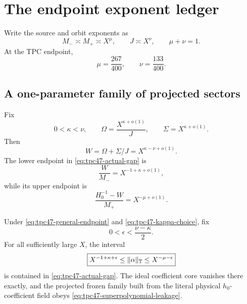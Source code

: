 \section{The endpoint exponent ledger}
\label{sec:tpc47-endpoint}

Write the source and orbit exponents as
\begin{equation}
 M_-\asymp M_+\asymp X^\mu,
 \qquad
 J\asymp X^\nu,
 \qquad
 \mu+\nu=1.
 \label{eq:tpc47-general-endpoint}
\end{equation}
At the TPC endpoint,
\begin{equation}
 \mu=\frac{267}{400},
 \qquad
 \nu=\frac{133}{400}.
 \label{eq:tpc47-mu-nu}
\end{equation}

\subsection{A one-parameter family of projected sectors}

Fix
\begin{equation}
 0<\kappa<\nu,
 \qquad
 \Omega=\frac{X^{\kappa+o(1)}}{J},
 \qquad
 \Sigma=X^{\kappa+o(1)}.
 \label{eq:tpc47-kappa-choice}
\end{equation}
Then
\begin{equation}
 W=\Omega+\Sigma/J=X^{\kappa-\nu+o(1)}.
 \label{eq:tpc47-W-scale}
\end{equation}
The lower endpoint in \eqref{eq:tpc47-actual-gap} is
\begin{equation}
 \frac{W}{M_-}=X^{-1+\kappa+o(1)},
 \label{eq:tpc47-lower-gap-scale}
\end{equation}
while its upper endpoint is
\begin{equation}
 \frac{H_0^{-1}-W}{M_+}=X^{-\mu+o(1)}.
 \label{eq:tpc47-upper-gap-scale}
\end{equation}

\begin{theorem}
\label{thm:tpc47-robust-endpoint}
Under \eqref{eq:tpc47-general-endpoint} and
\eqref{eq:tpc47-kappa-choice}, fix
\begin{equation}
 0<\epsilon<\frac{\nu-\kappa}{2}.
 \label{eq:tpc47-epsilon-range}
\end{equation}
For all sufficiently large \(X\), the interval
\begin{equation}
 \boxed{
 X^{-1+\kappa+\epsilon}
 \le\|\alpha\|_{\mathbb T}\le
 X^{-\mu-\epsilon}}
 \label{eq:tpc47-robust-general-gap}
\end{equation}
is contained in \eqref{eq:tpc47-actual-gap}.  The ideal coefficient
core vanishes there exactly, and the projected frozen family built from
the literal physical \(h_0\)-coefficient field obeys
\eqref{eq:tpc47-superpolynomial-leakage}.
\end{theorem}

